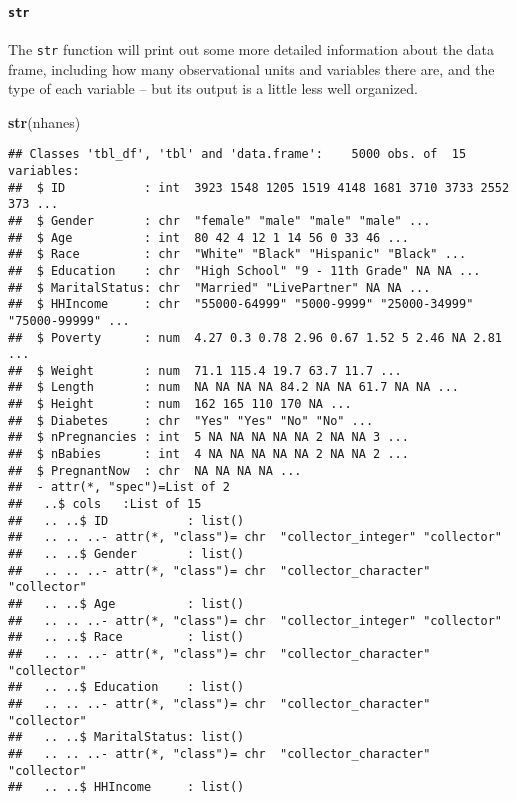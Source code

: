 \documentclass[]{article}
\newenvironment{Shaded}{\begin{snugshade}}{\end{snugshade}}
\newcommand{\KeywordTok}[1]{\textcolor[rgb]{0.13,0.29,0.53}{\textbf{#1}}}
\newcommand{\NormalTok}[1]{#1}
\let\oldparagraph\paragraph
\renewcommand{\paragraph}[1]{\oldparagraph{#1}\mbox{}}
\begin{document}
\paragraph{\texorpdfstring{\texttt{str}}{str}}\label{str}

The \texttt{str} function will print out some more detailed information
about the data frame, including how many observational units and
variables there are, and the type of each variable -- but its output is
a little less well organized.

\begin{Shaded}
\begin{Highlighting}[]
\KeywordTok{str}\NormalTok{(nhanes)}
\end{Highlighting}
\end{Shaded}

\begin{verbatim}
## Classes 'tbl_df', 'tbl' and 'data.frame':    5000 obs. of  15 variables:
##  $ ID           : int  3923 1548 1205 1519 4148 1681 3710 3733 2552 373 ...
##  $ Gender       : chr  "female" "male" "male" "male" ...
##  $ Age          : int  80 42 4 12 1 14 56 0 33 46 ...
##  $ Race         : chr  "White" "Black" "Hispanic" "Black" ...
##  $ Education    : chr  "High School" "9 - 11th Grade" NA NA ...
##  $ MaritalStatus: chr  "Married" "LivePartner" NA NA ...
##  $ HHIncome     : chr  "55000-64999" "5000-9999" "25000-34999" "75000-99999" ...
##  $ Poverty      : num  4.27 0.3 0.78 2.96 0.67 1.52 5 2.46 NA 2.81 ...
##  $ Weight       : num  71.1 115.4 19.7 63.7 11.7 ...
##  $ Length       : num  NA NA NA NA 84.2 NA NA 61.7 NA NA ...
##  $ Height       : num  162 165 110 170 NA ...
##  $ Diabetes     : chr  "Yes" "Yes" "No" "No" ...
##  $ nPregnancies : int  5 NA NA NA NA NA 2 NA NA 3 ...
##  $ nBabies      : int  4 NA NA NA NA NA 2 NA NA 2 ...
##  $ PregnantNow  : chr  NA NA NA NA ...
##  - attr(*, "spec")=List of 2
##   ..$ cols   :List of 15
##   .. ..$ ID           : list()
##   .. .. ..- attr(*, "class")= chr  "collector_integer" "collector"
##   .. ..$ Gender       : list()
##   .. .. ..- attr(*, "class")= chr  "collector_character" "collector"
##   .. ..$ Age          : list()
##   .. .. ..- attr(*, "class")= chr  "collector_integer" "collector"
##   .. ..$ Race         : list()
##   .. .. ..- attr(*, "class")= chr  "collector_character" "collector"
##   .. ..$ Education    : list()
##   .. .. ..- attr(*, "class")= chr  "collector_character" "collector"
##   .. ..$ MaritalStatus: list()
##   .. .. ..- attr(*, "class")= chr  "collector_character" "collector"
##   .. ..$ HHIncome     : list()

\end{verbatim}
\end{document}
